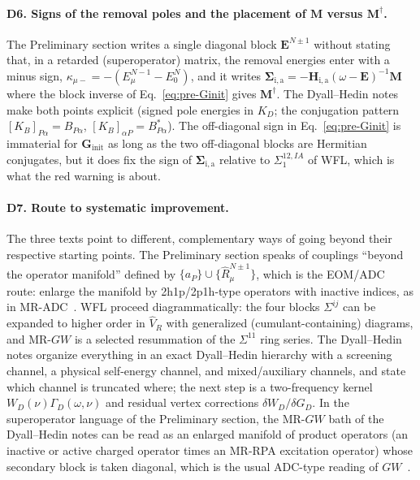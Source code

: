 \documentclass[11pt,a4paper]{article}
\newcommand{\bG}{\boldsymbol{G}}
\newcommand{\bSigma}{\boldsymbol{\Sigma}}
\newcommand{\bH}{\boldsymbol{H}}
\newcommand{\bM}{\boldsymbol{M}}
\newcommand{\bE}{\boldsymbol{E}}
\newcommand{\GW}{$GW$}
\newcommand{\MRGW}{MR-$GW$}
\newcommand{\WFL}{WFL}
\newcommand{\Pre}{Preliminary section}
\newcommand{\DHN}{Dyall--Hedin notes}
\begin{document}
\paragraph{D6. Signs of the removal poles and the placement of $\bM$ versus $\bM^\dagger$.}
The \Pre{} writes a single diagonal block $\bE^{N\pm1}$ without stating that,
in a retarded (superoperator) matrix, the removal energies enter with a minus
sign, $\kappa_{\mu-}=-(E_\mu^{N-1}-E_0^N)$, and it writes
$\bSigma_{\mathrm{i,a}}=-\bH_{\mathrm{i,a}}(\omega-\bE)^{-1}\bM$ where the block
inverse of Eq.~\eqref{eq:pre-Ginit} gives $\bM^\dagger$.  The \DHN{} make both
points explicit (signed pole energies in $K_D$; the conjugation pattern
$[K_B]_{P\alpha}=B_{P\alpha}$, $[K_B]_{\alpha P}=B_{P\alpha}^*$).  The
off-diagonal sign in Eq.~\eqref{eq:pre-Ginit} is immaterial for
$\bG_{\text{init}}$ as long as the two off-diagonal blocks are Hermitian
conjugates, but it does fix the sign of $\bSigma_{\mathrm{i,a}}$ relative to
$\Sigma_1^{12,IA}$ of \WFL{}, which is what the red warning is about.

\paragraph{D7. Route to systematic improvement.}
The three texts point to different, complementary ways of going beyond their
respective starting points.  The \Pre{} speaks of couplings ``beyond the
operator manifold'' defined by $\{a_P\}\cup\{\hat R^{N\pm1}_\mu\}$, which is
the EOM/ADC route: enlarge the manifold by 2h1p/2p1h-type operators with
inactive indices, as in MR-ADC~\cite{Sokolov2018,ChatterjeeSokolov2019}.
\WFL{} proceed diagrammatically: the four blocks $\Sigma^{ij}$ can be expanded
to higher order in $\hat V_R$ with generalized (cumulant-containing) diagrams,
and \MRGW{} is a selected resummation of the $\Sigma^{11}$ ring series.  The
\DHN{} organize everything in an exact Dyall--Hedin hierarchy with a screening
channel, a physical self-energy channel, and mixed/auxiliary channels, and
state which channel is truncated where; the next step is a two-frequency
kernel $W_D(\nu)\Gamma_D(\omega,\nu)$ and residual vertex corrections
$\delta W_D/\delta G_D$.  In the superoperator language of the \Pre{}, the
\MRGW{} bath of the \DHN{} can be read as an enlarged manifold of product
operators (an inactive or active charged operator times an MR-RPA excitation
operator) whose secondary block is taken diagonal, which is the usual
ADC-type reading of \GW{}~\cite{MarieTolleLoos2026}.
\end{document}
